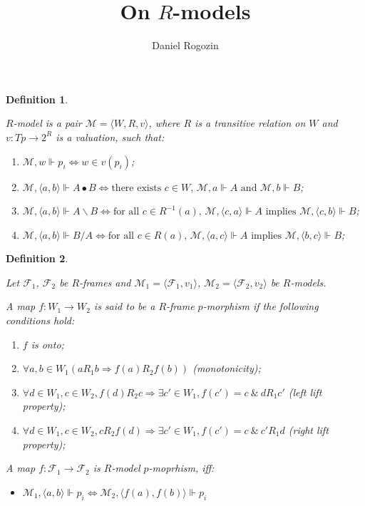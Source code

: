 \documentclass[a4paper]{article}
\date{}
\author[1,2]{Daniel Rogozin}
\affil[1]{Lomonosov Moscow State University}
\affil[2]{Serokell O\"{U}}
\title{On $R$-models}
\theoremstyle{defin}
\newtheorem{defin}{Definition}
\theoremstyle{theorem}
\theoremstyle{prop}
\theoremstyle{lemma}
\theoremstyle{ex}
\theoremstyle{col}
\begin{document}
\maketitle

\begin{defin}
  $ $

  $R$-model is a pair $\mathcal{M} = \langle W, R, v \rangle$,
  where $R$ is a transitive relation on $W$ and $v : Tp \to 2^R$ is a valuation, such that:

  \begin{enumerate}
    \item $\mathcal{M}, w \Vdash p_i \Leftrightarrow w \in v(p_i)$;
    \item $\mathcal{M}, \langle a, b \rangle \Vdash A \bullet B \Leftrightarrow
      \text{there exists $c \in W$, $\mathcal{M}, a \Vdash A$ and $\mathcal{M}, b \Vdash B$}$;
    \item $\mathcal{M}, \langle a, b \rangle \Vdash A \backslash B \Leftrightarrow
      \text{for all $c \in R^{-1}(a)$, $\mathcal{M}, \langle c, a \rangle \Vdash A$ implies
      $\mathcal{M}, \langle c, b \rangle \Vdash B$}$;
      \item $\mathcal{M}, \langle a, b \rangle \Vdash B / A \Leftrightarrow
        \text{for all $c \in R(a)$, $\mathcal{M}, \langle a, c \rangle \Vdash A$ implies
        $\mathcal{M}, \langle b, c \rangle \Vdash B$}$;
  \end{enumerate}
\end{defin}

\begin{defin}
  $ $

  Let $\mathcal{F}_1$, $\mathcal{F}_2$ be $R$-frames and
  $\mathcal{M}_1 = \langle \mathcal{F}_1, v_1 \rangle$, $\mathcal{M}_2 = \langle \mathcal{F}_2, v_2 \rangle$
  be $R$-models.

  A map $f : W_1 \to W_2$ is said to be a $R$-frame $p$-morphism if the following conditions hold:

  \begin{enumerate}
    \item $f$ is onto;
    \item $\forall a, b \in W_1 (a R_1 b \Rightarrow f(a) R_2 f (b))$ (monotonicity);
    \item $\forall d \in W_1, c \in W_2, f(d) R_2 c \Rightarrow \exists c' \in W_1, f(c') = c \: \& \: d R_1 c'$ (left lift property);
    \item $\forall d \in W_1, c \in W_2, c R_2 f(d) \Rightarrow \exists c' \in W_1, f(c') = c \: \& \: c' R_1 d$ (right lift property);
  \end{enumerate}

  A map $f : \mathcal{F}_1 \to \mathcal{F}_2$ is $R$-model $p$-moprhism, iff:

  \begin{itemize}
    \item $\mathcal{M}_1, \langle a, b \rangle \Vdash p_i \Leftrightarrow \mathcal{M}_2, \langle f(a), f(b) \rangle \Vdash p_i$
  \end{itemize}
\end{defin}
\end{document}
